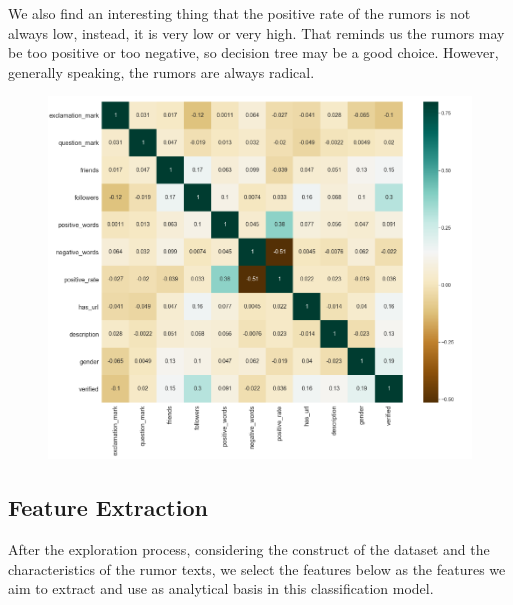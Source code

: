 \documentclass[12pt,a4paper]{article}
\begin{document}
We also find an interesting thing that the positive rate of the rumors is not always low, instead, it is very low or very high. That reminds us the rumors may be too positive or too negative, so decision tree may be a good choice. However, generally speaking, the rumors are always radical.
\clearpage
\begin{figure}[htbp]
	\centering\includegraphics[height=0.86\linewidth]{pic/heatmap}
\end{figure}

\subsection{Feature Extraction}
After the exploration process, considering the construct of the dataset and the characteristics of the rumor texts, we select the features below as the features we aim to extract and use as analytical basis in this classification model.
\end{document}
